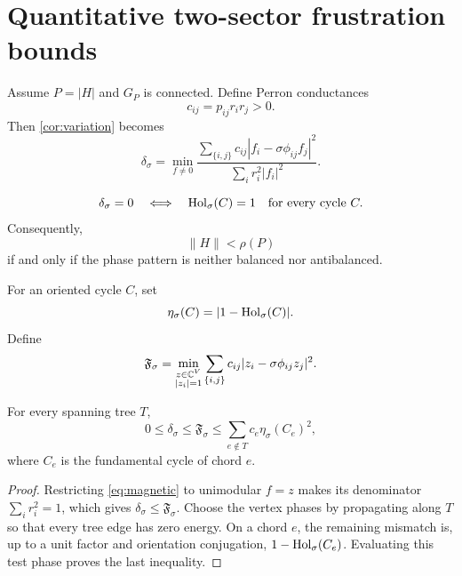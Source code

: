 \section{Quantitative two-sector frustration bounds}
\label{sec:quantitative}

Assume \(P=|H|\) and \(G_P\) is connected.  Define Perron
conductances
\begin{equation}\label{eq:conductance}
 c_{ij}=p_{ij}r_ir_j>0.
\end{equation}
Then \cref{cor:variation} becomes
\begin{equation}\label{eq:magnetic}
 \boxed{\displaystyle
 \delta_\sigma
 =
 \min_{f\ne0}
 \frac{\sum_{\{i,j\}}c_{ij}
 |f_i-\sigma\phi_{ij}f_j|^2}
 {\sum_i r_i^2|f_i|^2}.}
\end{equation}

\begin{corollary}\label{cor:strictness}
\[
 \delta_\sigma=0
 \quad\Longleftrightarrow\quad
 \operatorname{Hol}_\sigma(C)=1
 \quad\text{for every cycle }C.
\]
Consequently,
\[
 \|H\|<\rho(P)
\]
if and only if the phase pattern is neither balanced nor antibalanced.
\end{corollary}

\begin{definition}
For an oriented cycle \(C\), set
\[
 \eta_\sigma(C)=|1-\operatorname{Hol}_\sigma(C)|.
\]
Define
\begin{equation}\label{eq:frustration}
 \mathfrak F_\sigma
 =
 \min_{\substack{z\in\mathbb C^V\\|z_i|=1}}
 \sum_{\{i,j\}}c_{ij}|z_i-\sigma\phi_{ij}z_j|^2.
\end{equation}
\end{definition}

\begin{theorem}\label{thm:upper}
For every spanning tree \(T\),
\begin{equation}\label{eq:upper}
 0\le\delta_\sigma
 \le\mathfrak F_\sigma
 \le
 \sum_{e\notin T}c_e\eta_\sigma(C_e)^2,
\end{equation}
where \(C_e\) is the fundamental cycle of chord \(e\).
\end{theorem}

\begin{proof}
Restricting \eqref{eq:magnetic} to unimodular \(f=z\) makes its
denominator \(\sum_i r_i^2=1\), which gives
\(\delta_\sigma\le\mathfrak F_\sigma\).
Choose the vertex phases by propagating along \(T\) so that every tree
edge has zero energy.  On a chord \(e\), the remaining mismatch is,
up to a unit factor and orientation conjugation,
\(1-\operatorname{Hol}_\sigma(C_e)\).  Evaluating this test phase proves the last
inequality.
\end{proof}

